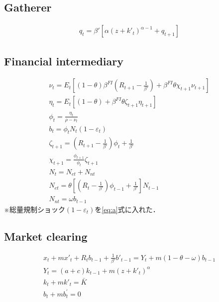 \documentclass[dvipdfmx]{jlreq}
\begin{document}
\subsection{Gatherer}
\begin{gather}
  q_t = \beta'\left[\alpha(z+k'_t)^{\alpha-1}+q_{t+1}\right]
\end{gather}

\subsection{Financial intermediary}
\begin{gather}
  \nu_t = E_t\left[(1-\theta)\beta^{FI}\left(R_{t+1}-\frac1{\beta'}\right)+\beta^{FI}\theta\chi_{t+1}\nu_{t+1}\right] \\
  \eta_t = E_t\left[(1-\theta)+\beta^{FI}\theta\zeta_{t+1}\eta_{t+1}\right] \\
  \phi_t = \frac{\eta_t}{\rho-\nu_t} \\
  b_t = \phi_tN_t(1-\varepsilon_t) \label{eq:a} \\
  \zeta_{t+1} = (R_{t+1}-\frac{1}{\beta'})\phi_t+\frac{1}{\beta'} \\
  \chi_{t+1} = \frac{\phi_{t+1}}{\phi_t}\zeta_{t+1} \\
  N_t = N_{et}+N_{nt} \\
  N_{et} = \theta\left[(R_t-\frac{1}{\beta'})\phi_{t-1}+\frac{1}{\beta'}\right]N_{t-1} \\
  N_{nt} = \omega b_{t-1}
\end{gather}
※総量規制ショック$(1-\varepsilon_t)$を\eqref{eq:a}式に入れた．

\subsection{Market clearing}
\begin{gather}
  x_t+mx'_t+R_tb_{t-1}+\frac1{\beta'}b'_{t-1} = Y_t+m(1-\theta-\omega)b_{t-1} \\
  Y_t = (a+c)k_{t-1}+m(z+k'_t)^{\alpha} \\
  k_t+mk'_t = \bar K \\
  b_t+mb^\prime_t = 0
\end{gather}
\end{document}
